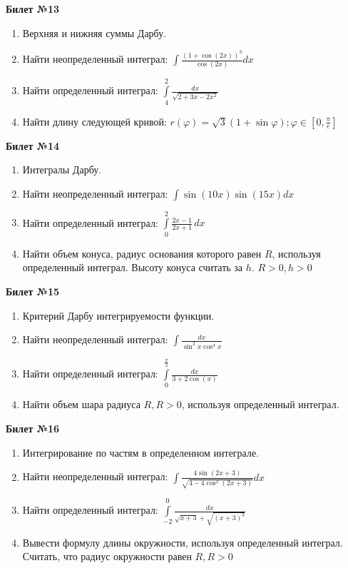 \documentclass[a4paper, 12pt]{article}
\begin{document}
\begin{center}
	\textbf{Билет №13}
\end{center}
\begin{enumerate}
	\item Верхняя и нижняя суммы Дарбу.
	\item Найти неопределенный интеграл: $\displaystyle \int{\frac{(1 + \cos(2x))^3}{\cos(2x)}dx}$
	\item Найти определенный интеграл: $\displaystyle \int\limits_{4}^{2} \frac{dx}{\sqrt{2 + 3x - 2x^2}}$
	\item Найти длину следующей кривой: $\displaystyle r(\varphi) = \sqrt{3}(1+\sin{\varphi}); \varphi \in \left[0, \frac{\pi}{e}\right]$
\end{enumerate}

\begin{center}
	\textbf{Билет №14}
\end{center}
\begin{enumerate}
	\item Интегралы Дарбу.
	\item Найти неопределенный интеграл: $\displaystyle \int{\sin(10x) \sin(15x) dx}$
	\item Найти определенный интеграл: $\displaystyle \int\limits_0^2 \frac{2x - 1}{2x + 1}\,dx$
	\item Найти объем конуса, радиус основания которого равен $R$, используя определенный интеграл. Высоту конуса считать за $h$. $\displaystyle R > 0, h> 0$
\end{enumerate}

\begin{center}
	\textbf{Билет №15}
\end{center}
\begin{enumerate}
	\item Критерий Дарбу интегрируемости функции.
	\item Найти неопределенный интеграл: $\displaystyle \int{\frac{dx}{\sin^2 x \cos^4 x}}$
	\item Найти определенный интеграл: $\displaystyle \int\limits_{0}^{\frac{\pi}{2}} \frac{dx}{3 + 2 \cos(x)}$
	\item Найти объем шара радиуса $R, R > 0$, используя определенный интеграл.
\end{enumerate}

\begin{center}
	\textbf{Билет №16}
\end{center}
\begin{enumerate}
	\item Интегрирование по частям в определенном интеграле.
	\item Найти неопределенный интеграл: $\displaystyle \int{\frac{4 \sin(2x+3)}{\sqrt{4 - 4\cos^2(2x+3)}}dx}$
	\item Найти определенный интеграл: $\displaystyle \int\limits_{-2}^{0} \frac{dx}{\sqrt{x+3}+\sqrt{(x+3)^{3}}}$
	\item Вывести формулу длины окружности, используя определенный интеграл. Считать, что радиус окружности равен $R, R>0$ 
\end{enumerate}
\end{document}
